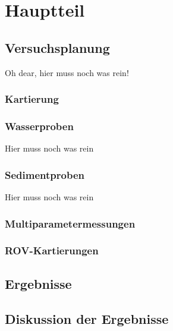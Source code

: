 

\chapter[Hauptteil]{Hauptteil}

\section{Versuchsplanung}
Oh dear, hier muss noch was rein!


\subsection{Kartierung}
    
    
\subsection{Wasserproben}
Hier muss noch was rein
\subsection{Sedimentproben}
Hier muss noch was rein
\subsection{Multiparametermessungen}

\subsection{ROV-Kartierungen}
\section{Ergebnisse}
\section{Diskussion der Ergebnisse}

